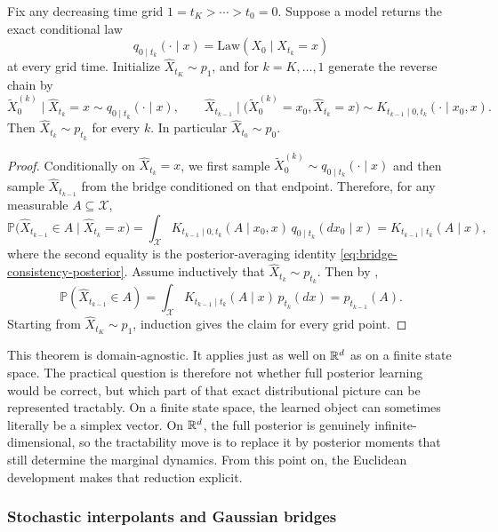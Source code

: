 \begin{theorem}
\label{thm:distributional-posterior-learning}
Fix any decreasing time grid \(1=t_K>\cdots>t_0=0\).
Suppose a model returns the exact conditional law
\[
  q_{0\mid t_k}(\cdot\mid x)=\mathrm{Law}(X_0\mid X_{t_k}=x)
\]
at every grid time.
Initialize \(\hat X_{t_K}\sim p_1\), and for \(k=K,\dots,1\) generate the reverse chain by
\[
  \tilde X_0^{(k)} \mid \hat X_{t_k}=x
  \sim
  q_{0\mid t_k}(\cdot\mid x),
  \qquad
  \hat X_{t_{k-1}} \mid \bigl(\tilde X_0^{(k)}=x_0,\hat X_{t_k}=x\bigr)
  \sim
  K_{t_{k-1}\mid 0,t_k}(\cdot\mid x_0,x).
\]
Then \(\hat X_{t_k}\sim p_{t_k}\) for every \(k\).
In particular \(\hat X_{t_0}\sim p_0\).
\end{theorem}
\begin{proof}
Conditionally on \(\hat X_{t_k}=x\), we first sample \(\tilde X_0^{(k)}\sim q_{0\mid t_k}(\cdot\mid x)\) and then sample \(\hat X_{t_{k-1}}\) from the bridge conditioned on that endpoint.
Therefore, for any measurable \(A\subseteq\mathcal{X}\),
\[
  \mathbb{P}\bigl(\hat X_{t_{k-1}}\in A\mid \hat X_{t_k}=x\bigr)
  =
  \int_{\mathcal{X}} K_{t_{k-1}\mid 0,t_k}(A\mid x_0,x)\,q_{0\mid t_k}(dx_0\mid x)
  =
  K_{t_{k-1}\mid t_k}(A\mid x),
\]
where the second equality is the posterior-averaging identity \eqref{eq:bridge-consistency-posterior}.
Assume inductively that \(\hat X_{t_k}\sim p_{t_k}\).
Then by ,
\[
  \mathbb{P}(\hat X_{t_{k-1}}\in A)
  =
  \int_{\mathcal{X}} K_{t_{k-1}\mid t_k}(A\mid x)\,p_{t_k}(dx)
  =
  p_{t_{k-1}}(A).
\]
Starting from \(\hat X_{t_K}\sim p_1\), induction gives the claim for every grid point.%
\end{proof}

This theorem is domain-agnostic.
It applies just as well on \(\mathbb{R}^d\) as on a finite state space.
The practical question is therefore not whether full posterior learning would be correct, but which part of that exact distributional picture can be represented tractably.
On a finite state space, the learned object can sometimes literally be a simplex vector.
On \(\mathbb{R}^d\), the full posterior is genuinely infinite-dimensional, so the tractability move is to replace it by posterior moments that still determine the marginal dynamics.
From this point on, the Euclidean development makes that reduction explicit.

\subsubsection{Stochastic interpolants and Gaussian bridges}

